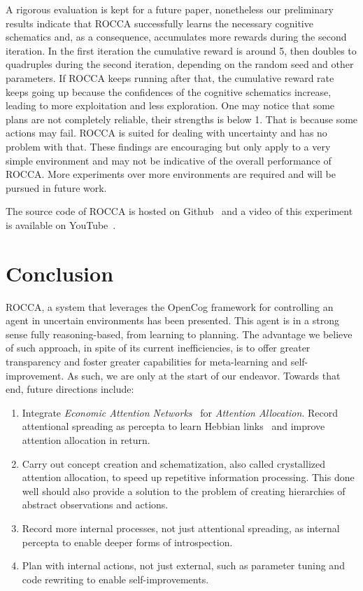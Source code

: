 \documentclass[runningheads]{llncs}
\begin{document}
A rigorous evaluation is kept for a future paper, nonetheless our
preliminary results indicate that ROCCA successfully learns the
necessary cognitive schematics and, as a consequence, accumulates more
rewards during the second iteration.  In the first iteration the
cumulative reward is around 5, then doubles to quadruples during the
second iteration, depending on the random seed and other parameters.
If ROCCA keeps running after that, the cumulative reward rate keeps
going up because the confidences of the cognitive schematics increase,
leading to more exploitation and less exploration.  One may notice
that some plans are not completely reliable, their strengths is below
1.  That is because some actions may fail.  ROCCA is suited for
dealing with uncertainty and has no problem with that.  These findings
are encouraging but only apply to a very simple environment
and may not be indicative of the overall performance of ROCCA.  More
experiments over more environments are required
and will be pursued in future work.

The source code of ROCCA is hosted on Github~\cite{ROCCACode} and a
video of this experiment is available on YouTube~\cite{ROCCADemo}.

\section{Conclusion}
\label{sec:conclusion}
ROCCA, a system that leverages the OpenCog framework for controlling
an agent in uncertain environments has been presented.  This agent is
in a strong sense fully reasoning-based, from learning to planning.
The advantage we believe of such approach, in spite of its current
inefficiencies, is to offer greater transparency and foster greater
capabilities for meta-learning and self-improvement.  As such, we are
only at the start of our endeavor.  Towards that end, future
directions include:
\begin{enumerate}
\item Integrate \emph{Economic Attention Networks}~\cite{Pitt2009} for
  \emph{Attention Allocation}.  Record attentional spreading as
  percepta to learn Hebbian links~\cite{Pitt2009} and improve
  attention allocation in return.
\item Carry out concept creation and schematization, also called
  crystallized attention allocation, to speed up repetitive
  information processing.  This done well should also provide a
  solution to the problem of creating hierarchies of abstract
  observations and actions.
\item Record more internal processes, not just attentional spreading, as
  internal percepta to enable deeper forms of introspection.
\item Plan with internal actions, not just external, such as parameter
  tuning and code rewriting to enable self-improvements.
\end{enumerate}
\end{document}
